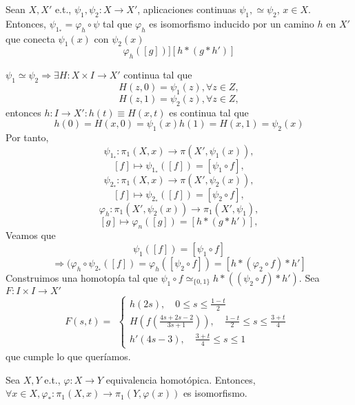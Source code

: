 \begin{lem}
  Sean $X, X'$ e.t., $\psi_{1}, \psi_{2} : X \to X' $, aplicaciones continuas $\psi_{1}, \simeq \psi_{2}$, $x \in X$. Entonces, $\psi_{1}_* = \varphi_{h} \circ \psi $ tal que $\varphi_{h}$ es isomorfismo inducido por un camino $h$ en $X'$ que conecta $\psi_{1}(x)$ con $\psi_{2}(x)$
  \[ 
    \varphi_{h}([g]) ] [h * (g * h')] 
  \] 
\end{lem}

\begin{dem}
  $\psi_{1} \simeq \psi_{2} \Rightarrow \exists H  : X \times I \to X'$ continua tal que
  \[ 
    H(z,0) = \psi_{1}(z), \forall z \in Z, 
  \] 
  \[ 
    H(z,1) = \psi_{2}(z), \forall z \in Z,
  \] 
  entonces $h : I \to X': h(t) \equiv H(x, t)$ es continua tal que
  \[ 
    h(0) = H(x, 0) = \psi_{1}(x)
    h(1) = H(x, 1) = \psi_{2}(x)
  \] 
  Por tanto,
  \[
    \psi_{1}_*  :  \pi_{1}(X, x) \to \pi(X', \psi_{1}(x)),
  \]
  \[ 
    [f] \mapsto \psi_{1}_*([f]) = [\psi_{1} \circ f],
  \] 
  \[
    \psi_{2}_*  :  \pi_{1}(X, x) \to \pi(X', \psi_{2}(x)),
  \]
  \[ 
    [f] \mapsto \psi_{2}_*([f]) = [\psi_{2} \circ f],
  \] 
  \[ 
    \varphi_{h} : \pi_{1}(X', \psi_{2}(x)) \to \pi_{1}(X', \psi_{1}),
  \] 
  \[ 
    [g] \mapsto \varphi_{n}([g]) = [h * (g * h')],
  \] 
  Veamos que
  \[
    \psi_{1}([f]) = [\psi_{1} \circ f]
  \]
  \[ 
    \Rightarrow (\varphi_{h} \circ \psi_{2}_*([f]) = \varphi_{h}([\psi_{2} \circ f]) = [h * (\varphi_{2} \circ f) * h']
  \] 
  Construimos una homotopía tal que $\psi_{1} \circ f \simeq_{\{ 0, 1 \}} h * ((\psi_{2} \circ f) * h')$. Sea $F : I \times I \to X'$
  \[ 
    F(s, t) =
    \begin{aligned}
      \begin{cases}
        h(2s), \quad 0 \leq s \leq \frac{1 - t}{2} \\
        H(f(\frac{4s + 2s - 2}{3s + 1})), \quad \frac{1 - t}{2} \leq s \leq \frac{3 + t}{4} \\
        h'(4s - 3), \quad \frac{3 + t}{4} \leq s \leq 1
      \end{cases}
    \end{aligned}
  \] 
  que cumple lo que queríamos.
\end{dem}

\begin{prop}
  Sea $X, Y$ e.t., $\varphi : X \to Y $ equivalencia homotópica. Entonces, $\forall x \in X, \varphi_* : \pi_{1}(X, x) \to \pi_{1}(Y, \varphi(x))$ es isomorfismo.
\end{prop}

